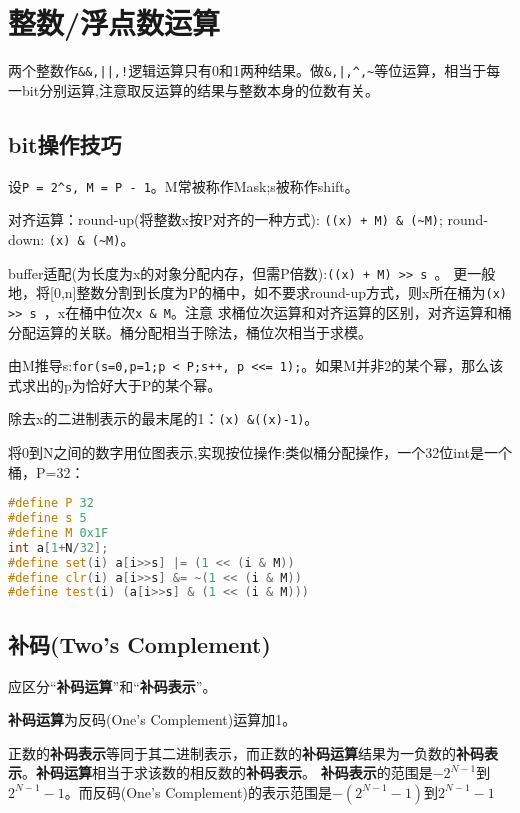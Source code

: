 \section{整数/浮点数运算}

两个整数作\verb+&&,||,!+逻辑运算只有0和1两种结果。做\verb+&,|,^,~+等位运算，相当于每一bit分别运算,注意取反运算的结果与整数本身的位数有关。



\subsection{bit操作技巧}
设\verb$P = 2^s, M = P - 1$。M常被称作Mask;s被称作shift。

对齐运算：round-up(将整数x按P对齐的一种方式): \verb$((x) + M) & (~M)$; round-down: \verb$(x) & (~M)$。

buffer适配(为长度为x的对象分配内存，但需P倍数):\verb$((x) + M) >> s $。
更一般地，将[0,n]整数分割到长度为P的桶中，如不要求round-up方式，则x所在桶为\verb$(x) >> s $，x在桶中位次\verb$x & M$。注意
求桶位次运算和对齐运算的区别，对齐运算和桶分配运算的关联。桶分配相当于除法，桶位次相当于求模。

由M推导s:\verb$for(s=0,p=1;p < P;s++, p <<= 1);$。如果M并非2的某个幂，那么该式求出的p为恰好大于P的某个幂。

除去x的二进制表示的最末尾的1：\verb|(x) &((x)-1)|。

将0到N之间的数字用位图表示,实现按位操作:类似桶分配操作，一个32位int是一个桶，P=32：
\begin{lstlisting}[language=C++]
#define P 32
#define s 5
#define M 0x1F
int a[1+N/32];
#define set(i) a[i>>s] |= (1 << (i & M))
#define clr(i) a[i>>s] &= ~(1 << (i & M))
#define test(i) (a[i>>s] & (1 << (i & M)))
\end{lstlisting}


\subsection{补码(Two's Complement)}
应区分“\textbf{补码运算}”和“\textbf{补码表示}”。

\textbf{补码运算}为反码(One's Complement)运算加1。

正数的\textbf{补码表示}等同于其二进制表示，而正数的\textbf{补码运算}结果为一负数的\textbf{补码表示}。\textbf{补码运算}相当于求该数的相反数的\textbf{补码表示}。
\textbf{补码表示}的范围是$-2^{N-1}$到$2^{N-1}-1$。而反码(One's Complement)的表示范围是$-(2^{N-1}-1)$到$2^{N-1}-1$

